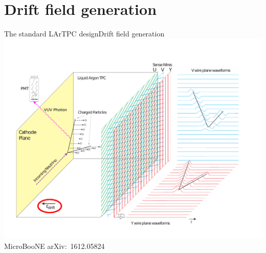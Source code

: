 \documentclass[]{beamer}
\newcommand*{\uboone}{{MicroBooNE}}
\newcommand*{\lartpc}{{LArTPC}}
\begin{document}
\section{Drift field generation}

\begin{frame}{The standard \lartpc{} design}{Drift field generation}
	\centering
	\includegraphics[viewport=35 40 720 540, clip, height=.66\textheight]{defence/TPCprinciple_HV}\\
	{\tiny \uboone{} arXiv:~1612.05824~\cite{uboone}}\\
\end{frame}
\end{document}
